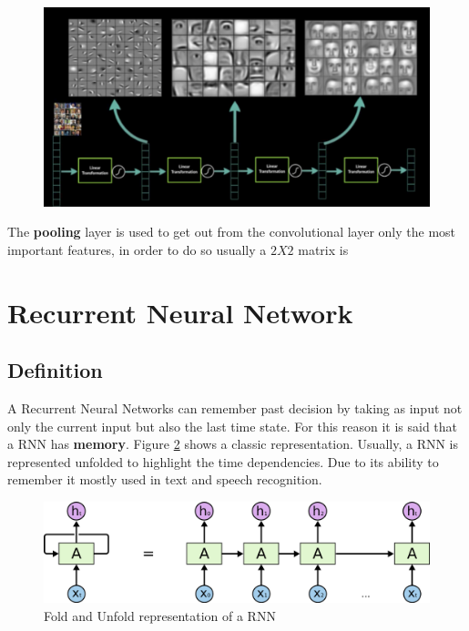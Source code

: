 \documentclass[11pt]{article}
\begin{document}
\begin{figure}[H]
\centering
\includegraphics[scale=0.35]{images/cnn_faces}
\caption{}
\label{fig: cnn_faces}	
\end{figure}
The \textbf{pooling} layer is used to get out from the convolutional layer only the most important features, in order to do so usually a $2X2$ matrix is 
\section{Recurrent Neural Network}
\subsection{Definition}
A Recurrent Neural Networks can remember past decision by taking as input not only the current input but also the last time state. For this reason it is said that a RNN has \textbf{memory}. Figure \ref{fig: RNN} shows a classic representation. Usually, a RNN is represented unfolded to highlight the time dependencies. Due to its ability to remember it mostly used in text and speech recognition.
\begin{figure}[h]
\centering
\includegraphics[scale=0.2]{images/rnn}	
\caption{Fold and Unfold representation of a RNN}
\label{fig: RNN}
\end{figure}
\end{document}
